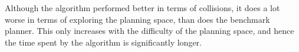 Although the \rrtfunnel{} algorithm performed better in terms of collisions, it
does a lot worse in terms of exploring the planning space, than does the
benchmark planner. This only increases with the difficulty of the planning
space, and hence the time spent by the \rrtfunnel{} algorithm is significantly
longer.
